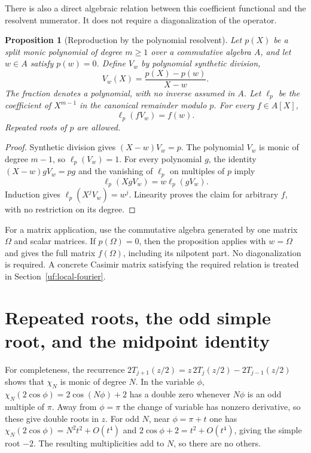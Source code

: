 \documentclass[11pt]{article}
\numberwithin{equation}{section}
\newtheorem{proposition}[theorem]{Proposition}
\theoremstyle{definition}\newtheorem{definition}[theorem]{Definition}
\theoremstyle{remark}\newtheorem{remark}[theorem]{Remark}
\begin{document}
There is also a direct algebraic relation between this coefficient
functional and the resolvent numerator. It does not require a
diagonalization of the operator.

\begin{proposition}[Reproduction by the polynomial resolvent]
\label{prop:resolvent-reproduction}
Let \(p(X)\) be a split monic polynomial of degree \(m\ge1\)
over a commutative algebra \(A\), and let \(w\in A\) satisfy
\(p(w)=0\). Define \(V_w\) by polynomial synthetic division,
\[
 V_w(X)=\frac{p(X)-p(w)}{X-w}.
\]
The fraction denotes a polynomial, with no inverse assumed in \(A\).
Let \(\ell_p\) be the coefficient of \(X^{m-1}\) in the
canonical remainder modulo \(p\). For every \(f\in A[X]\),
\[
                   \ell_p(fV_w)=f(w).
\]
Repeated roots of \(p\) are allowed.
\end{proposition}

\begin{proof}
Synthetic division gives \((X-w)V_w=p\). The polynomial \(V_w\)
is monic of degree \(m-1\), so \(\ell_p(V_w)=1\).
For every polynomial \(g\), the identity
\((X-w)gV_w=pg\) and the vanishing of \(\ell_p\) on multiples
of \(p\) imply
\[
               \ell_p(XgV_w)=w\ell_p(gV_w).
\]
Induction gives \(\ell_p(X^jV_w)=w^j\). Linearity proves the
claim for arbitrary \(f\), with no restriction on its degree.
\end{proof}

For a matrix application, use the commutative algebra generated by
one matrix $\Omega$ and scalar matrices. If $p(\Omega)=0$, then the
proposition applies with $w=\Omega$ and gives the full matrix $f(\Omega)$,
including its nilpotent part. No diagonalization is required. A concrete
Casimir matrix satisfying the required relation is treated in
Section~\ref{uf:local-fourier}.

\section{Repeated roots, the odd simple root, and the midpoint
identity}\label{uf:sec-repeated-roots-the-odd-simple-root-and-the-midpoint-identity}

For completeness, the recurrence $2T_{j+1}(z/2)=z\,2T_j(z/2)-2T_{j-1}(z/2)$
shows that $\chi_N$ is monic of degree $N$. In the variable $\phi$,
$\chi_N(2\cos\phi)=2\cos(N\phi)+2$ has a double zero whenever
$N\phi$ is an odd multiple of $\pi$. Away from $\phi=\pi$ the
change of variable has nonzero derivative, so these give double roots
in $z$. For odd $N$, near $\phi=\pi+t$ one has
$\chi_N(2\cos\phi)=N^2t^2+O(t^4)$ and
$2\cos\phi+2=t^2+O(t^4)$, giving the simple root $-2$.
The resulting multiplicities add to $N$, so there are no others.
\end{document}
